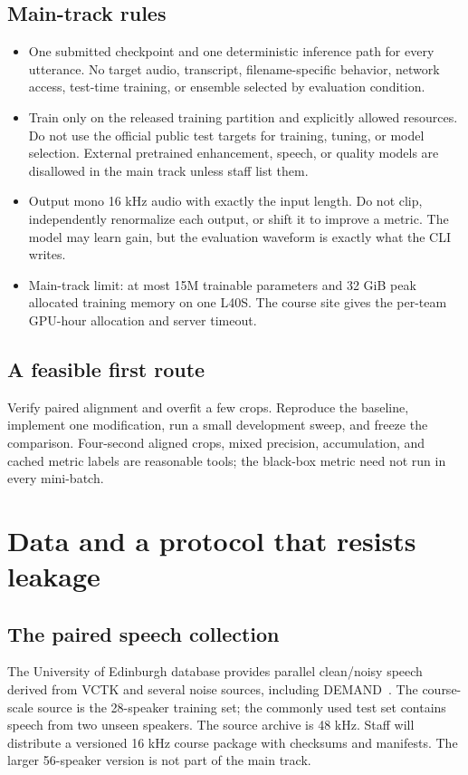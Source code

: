 \documentclass[11pt,letterpaper]{article}
\newcommand{\page}[1]{\clearpage\section{#1}}
\begin{document}
\subsection{Main-track rules}
\begin{itemize}
\item One submitted checkpoint and one deterministic inference path for every utterance. No target audio, transcript, filename-specific behavior, network access, test-time training, or ensemble selected by evaluation condition.
\item Train only on the released training partition and explicitly allowed resources. Do not use the official public test targets for training, tuning, or model selection. External pretrained enhancement, speech, or quality models are disallowed in the main track unless staff list them.
\item Output mono 16 kHz audio with exactly the input length. Do not clip, independently renormalize each output, or shift it to improve a metric. The model may learn gain, but the evaluation waveform is exactly what the CLI writes.
\item Main-track limit: at most 15M trainable parameters and 32 GiB peak allocated training memory on one L40S. The course site gives the per-team GPU-hour allocation and server timeout.
\end{itemize}

\subsection{A feasible first route}
Verify paired alignment and overfit a few crops. Reproduce the baseline, implement one modification, run a small development sweep, and freeze the comparison. Four-second aligned crops, mixed precision, accumulation, and cached metric labels are reasonable tools; the black-box metric need not run in every mini-batch.

\normalsize
\page{Data and a protocol that resists leakage}
\subsection{The paired speech collection}
The University of Edinburgh database provides parallel clean/noisy speech derived from VCTK and several noise sources, including DEMAND~\cite{dataset}. The course-scale source is the 28-speaker training set; the commonly used test set contains speech from two unseen speakers. The source archive is 48 kHz. Staff will distribute a versioned 16 kHz course package with checksums and manifests. The larger 56-speaker version is not part of the main track.
\end{document}
